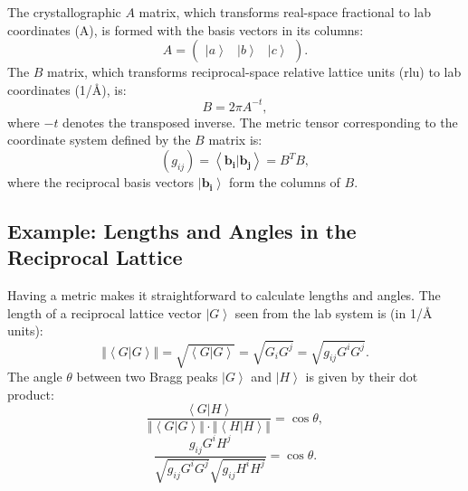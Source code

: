 The crystallographic $A$ matrix, which transforms real-space fractional to lab coordinates (A), is formed with the basis vectors in its columns:
\begin{equation}
	A = \left(
		\begin{array}{ccc}
			\left| a \right> & \left| b \right> & \left| c \right>
		\end{array}
	\right).
\end{equation}
The $B$ matrix, which transforms reciprocal-space relative lattice units (rlu) to lab coordinates (1/\AA), is:
\begin{equation} B = 2 \pi A^{-t}, \end{equation}
where $-t$ denotes the transposed inverse.
The metric tensor corresponding to the coordinate system defined by the $B$ matrix is:
\begin{equation} \left(g_{ij}\right) = \left<\bm{b_i} | \bm{b_j} \right> = B^T B, \end{equation}
where the reciprocal basis vectors $\left| \bm{b_i} \right>$ form the columns of $B$.


\subsection*{Example: Lengths and Angles in the Reciprocal Lattice}
Having a metric makes it straightforward to calculate lengths and angles.
The length of a reciprocal lattice vector $\left| G \right>$ seen from the lab system is (in 1/\AA{} units):
\begin{equation}
	\left\Vert \left< G | G \right> \right\Vert = \sqrt{\left< G | G \right>} = \sqrt{G_i G^j} = \sqrt{g_{ij} G^i G^j}.
\end{equation}
The angle $\theta$ between two Bragg peaks $\left| G \right>$ and $\left| H \right>$ is given by their dot product:
\begin{equation}
	\frac{\left< G | H \right>}{\left\Vert \left< G | G \right> \right\Vert \cdot \left\Vert \left< H | H \right> \right\Vert} = \cos \theta,
\end{equation}
\begin{equation}
	\frac{g_{ij} G^i H^j }{\sqrt{g_{ij} G^i G^j} \sqrt{g_{ij} H^i H^j}} = \cos \theta.
\end{equation}


